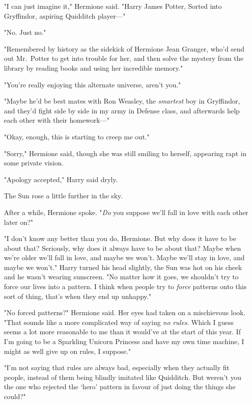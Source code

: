 "I can just imagine it," Hermione said. "Harry James Potter, Sorted into
Gryffindor, aspiring Quidditch player---"

"No. Just no."

"Remembered by history as the sidekick of Hermione Jean Granger, who'd send out
Mr.~Potter to get into trouble for her, and then solve the mystery from the
library by reading books and using her incredible memory."

"You're really enjoying this alternate universe, aren't you."

"Maybe he'd be best mates with Ron Weasley, the \emph{smartest} boy in
Gryffindor, and they'd fight side by side in my army in Defense class, and
afterwards help each other with their homework---"

"Okay, enough, this is starting to creep me out."

"Sorry," Hermione said, though she was still smiling to herself, appearing rapt
in some private vision.

"Apology accepted," Harry said dryly.

The Sun rose a little further in the sky.

After a while, Hermione spoke. "\emph{Do} you suppose we'll fall in love with
each other later on?"

"I don't know any better than you do, Hermione. But why does it have to be
about that? Seriously, why does it always have to be about that? Maybe when
we're older we'll fall in love, and maybe we won't. Maybe we'll stay in love,
and maybe we won't." Harry turned his head slightly, the Sun was hot on his
cheek and he wasn't wearing sunscreen. "No matter how it goes, we shouldn't try
to force our lives into a pattern. I think when people try to \emph{force}
patterns onto this sort of thing, that's when they end up unhappy."

"No forced patterns?" Hermione said. Her eyes had taken on a mischievous look.
"That sounds like a more complicated way of saying \emph{no rules}. Which I
guess seems a lot more reasonable to me than it would've at the start of this
year. If I'm going to be a Sparkling Unicorn Princess and have my own time
machine, I might as well give up on rules, I suppose."

"I'm not saying that rules are always bad, especially when they actually fit
people, instead of them being blindly imitated like Quidditch. But weren't you
the one who rejected the `hero' pattern in favour of just doing the things she
could?"


